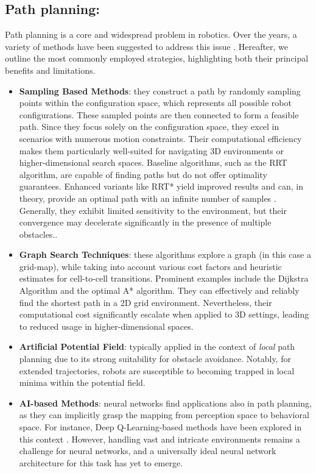 \subsection{Path planning:}
Path planning is a core and widespread problem in robotics. Over the years, a variety of methods have been suggested to address this issue \cite{path_planning_review}. Hereafter, we outline the most commonly employed strategies, highlighting both their principal benefits and limitations.
\begin{itemize}
    \item \textbf{Sampling Based Methods}: they construct a path by randomly sampling points within the configuration space, which represents all possible robot configurations. These sampled points are then connected to form a feasible path. Since they focus solely on the configuration space, they excel in scenarios with numerous motion constraints. Their computational efficiency makes them particularly well-suited for navigating 3D environments or higher-dimensional search spaces.
    Baseline algorithms, such as the RRT algorithm, are capable of finding paths but do not offer optimality guarantees. Enhanced variants like RRT* yield improved results and can, in theory, provide an optimal path with an infinite number of samples \cite{rrt_star}. Generally, they exhibit limited sensitivity to the environment, but their convergence may decelerate significantly in the presence of multiple obstacles..
    \item \textbf{Graph Search Techniques}: these algorithms explore a graph (in this case a grid-map), while taking into account various cost factors and heuristic estimates for cell-to-cell transitions. Prominent examples include the Dijkstra Algorithm and the optimal A* algorithm. They can effectively and reliably find the shortest path in a 2D grid environment. Nevertheless, their computational cost significantly escalate when applied to 3D settings, leading to reduced usage in higher-dimensional spaces.
    \item \textbf{Artificial Potential Field}: typically applied in the context of \textit{local} path planning due to its strong suitability for obstacle avoidance. Notably, for extended trajectories, robots are susceptible to becoming trapped in local minima within the potential field.
    \item \textbf{AI-based Methods}: neural networks find applications also in path planning, as they can implicitly grasp the mapping from perception space to behavioral space. For instance, Deep Q-Learning-based methods have been explored in this context \cite{q_learning}. However, handling vast and intricate environments remains a challenge for neural networks, and a universally ideal neural network architecture for this task has yet to emerge.

\end{itemize}
